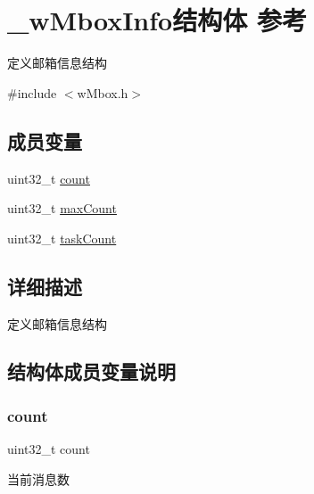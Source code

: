 \hypertarget{struct__w_mbox_info}{}\section{\+\_\+w\+Mbox\+Info结构体 参考}
\label{struct__w_mbox_info}


定义邮箱信息结构  




{\ttfamily \#include $<$w\+Mbox.\+h$>$}

\subsection*{成员变量}
\begin{DoxyCompactItemize}
\item 
uint32\+\_\+t \mbox{\hyperlink{struct__w_mbox_info_a86988a65e0d3ece7990c032c159786d6}{count}}
\item 
uint32\+\_\+t \mbox{\hyperlink{struct__w_mbox_info_a1cc8a4ba5eee24b560f9869012941e91}{max\+Count}}
\item 
uint32\+\_\+t \mbox{\hyperlink{struct__w_mbox_info_a80462c64b9184115aa568f08227f7f4a}{task\+Count}}
\end{DoxyCompactItemize}


\subsection{详细描述}
定义邮箱信息结构 

\subsection{结构体成员变量说明}
\mbox{\label{struct__w_mbox_info_a86988a65e0d3ece7990c032c159786d6}} 
\subsubsection{\texorpdfstring{count}{count}}
{\footnotesize\ttfamily uint32\+\_\+t count}

当前消息数 \mbox{\label{struct__w_mbox_info_a1cc8a4ba5eee24b560f9869012941e91}} 
